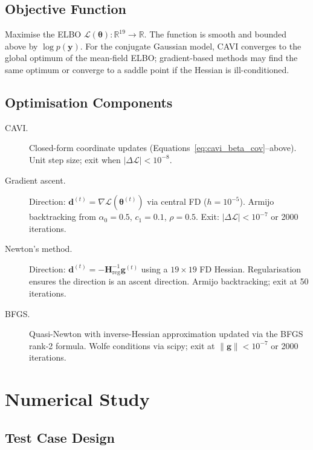 \documentclass[11pt,a4paper]{article}
\newcommand{\R}{\mathbb{R}}
\begin{document}
\subsection*{Objective Function}

Maximise the ELBO $\mathcal{L}(\bm{\theta}):\R^{19}\to\R$.
The function is smooth and bounded above by $\log p(\mathbf{y})$.
For the conjugate Gaussian model, CAVI converges to the global optimum of the
mean-field ELBO; gradient-based methods may find the same optimum or converge
to a saddle point if the Hessian is ill-conditioned.

\subsection*{Optimisation Components}

\begin{description}
\item[CAVI.]
  Closed-form coordinate updates (Equations~\ref{eq:cavi_beta_cov}--above).
  Unit step size; exit when $|\Delta\mathcal{L}| < 10^{-8}$.

\item[Gradient ascent.]
  Direction: $\bm{d}^{(t)} = \nabla\mathcal{L}(\bm{\theta}^{(t)})$ via central FD
  ($h=10^{-5}$).
  Armijo backtracking from $\alpha_0=0.5$, $c_1=0.1$, $\rho=0.5$.
  Exit: $|\Delta\mathcal{L}| < 10^{-7}$ or 2000 iterations.

\item[Newton's method.]
  Direction: $\bm{d}^{(t)} = -\bm{H}_{\mathrm{reg}}^{-1}\bm{g}^{(t)}$ using a
  $19\times 19$ FD Hessian.
  Regularisation ensures the direction is an ascent direction.
  Armijo backtracking; exit at 50 iterations.

\item[BFGS.]
  Quasi-Newton with inverse-Hessian approximation updated via the BFGS rank-2 formula.
  Wolfe conditions via scipy; exit at $\|\bm{g}\|<10^{-7}$ or 2000 iterations.
\end{description}

\section{Numerical Study}

\subsection{Test Case Design}
\end{document}
